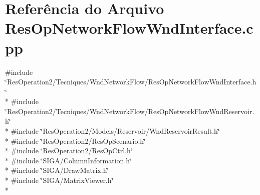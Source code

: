 \section{Referência do Arquivo Res\+Op\+Network\+Flow\+Wnd\+Interface.\+cpp}
\label{_res_op_network_flow_wnd_interface_8cpp}
{\ttfamily \#include \char`\"{}Res\+Operation2/\+Tecniques/\+Wnd\+Network\+Flow/\+Res\+Op\+Network\+Flow\+Wnd\+Interface.\+h\char`\"{}}\\*
{\ttfamily \#include \char`\"{}Res\+Operation2/\+Tecniques/\+Wnd\+Network\+Flow/\+Res\+Op\+Network\+Flow\+Wnd\+Reservoir.\+h\char`\"{}}\\*
{\ttfamily \#include \char`\"{}Res\+Operation2/\+Models/\+Reservoir/\+Wnd\+Reservoir\+Result.\+h\char`\"{}}\\*
{\ttfamily \#include \char`\"{}Res\+Operation2/\+Res\+Op\+Scenario.\+h\char`\"{}}\\*
{\ttfamily \#include \char`\"{}Res\+Operation2/\+Res\+Op\+Ctrl.\+h\char`\"{}}\\*
{\ttfamily \#include \char`\"{}S\+I\+G\+A/\+Column\+Information.\+h\char`\"{}}\\*
{\ttfamily \#include \char`\"{}S\+I\+G\+A/\+Draw\+Matrix.\+h\char`\"{}}\\*
{\ttfamily \#include \char`\"{}S\+I\+G\+A/\+Matrix\+Viewer.\+h\char`\"{}}\\*
